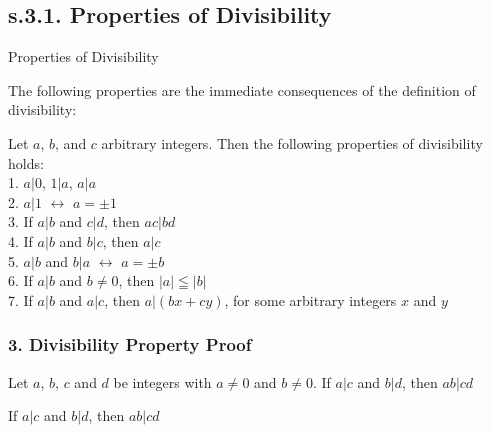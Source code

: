 \subsection{s.3.1. Properties of Divisibility}
\begin{definition}
Properties of Divisibility

The following properties are the immediate consequences of the definition of divisibility: 

\begin{tcolorbox}
	\begin{theorem}
		Let $a$, $b$, and $c$ arbitrary integers. Then the following properties of divisibility holds: \\
		1. $a | 0$, $1 | a$, $a | a$  \\
		2. $a | 1$ $\leftrightarrow$ $a = \pm 1$ \\
		3. If $a | b$ and $c | d$, then $ac | bd$ \\
		4. If $a | b$ and $b | c$, then $a | c$ \\
		5. $a | b$ and $b | a$ $\leftrightarrow$ $a = \pm b$ \\
		6. If $a | b$ and $b \neq 0$, then $|a| \leqq |b|$ \\
		7. If $a | b$ and $a | c$, then $a | (bx + cy)$, for some arbitrary integers $x$ and $y$ \\ 
		
	\end{theorem}
\end{tcolorbox}
\end{definition}




\subsubsection*{3. Divisibility Property Proof}

Let $a$, $b$, $c$ and $d$ be integers with $a \neq 0$ and $b \neq 0$. If $a | c$ and $b | d$, then $ab | cd$ \\

\begin{tcolorbox}
	\begin{theorem}
		If $a | c$ and $b | d$, then $ab | cd$
	\end{theorem}
\end{tcolorbox}

